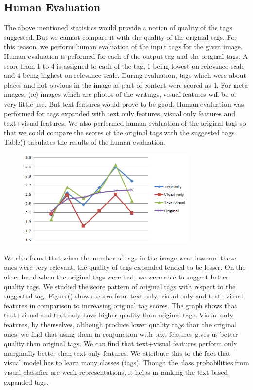 \documentclass[12pt]{article}
\begin{document}
\subsection{Human Evaluation}
The above mentioned statistics would provide a notion of quality of the tags suggested. But
we cannot compare it with the quality of the original tags. For this reason, we perform human
evaluation of the input tags for the given image. Human evaluation is peformed for each of the
output tag and the original tags. A score from 1 to 4 is assigned to each of the tag, 1 being
lowest on relevance scale and 4 being highest on relevance scale. During evaluation, tags which
were about places and not obvious in the image as part of content were scored as 1. For meta images,
(ie) images which are photos of the writings, visual features will be of very little use. But
text features would prove to be good. Human evaluation was performed for tags expanded with
text only features, visual only features and text+visual features. We also performed human
evaluation of the original tags so that we could compare the scores of the original tags with
the suggested tags. Table() tabulates the results of the human evaluation.

\begin{figure}[h]
\includegraphics[width=0.8\textwidth]{humanEvalGraph.png}
\end{figure}


We also found that when the number of tags in the image were less and those ones were very relevant,
the quality of tags expanded tended to be lesser. On the other hand when the original tags were bad,
we were able to suggest better quality tags. We studied the score pattern of original tags with respect
to the suggested tag. Figure() shows scores from text-only, visual-only and text+visual features in
comparison to increasing original tag scores. The graph shows that text+visual and text-only have
higher quality than original tags. Visual-only features, by themselves, although produce lower quality
tags than the original ones, we find that using them in conjunction with text features gives us better
quality than original tags. We can find that text+visual features perform only marginally better than
text only features. We attribute this to the fact that visual model has to learn many classes (tags).
Though the class probabilities from visual classifier are weak representations, it helps in ranking
the text based expanded tags.
\end{document}
